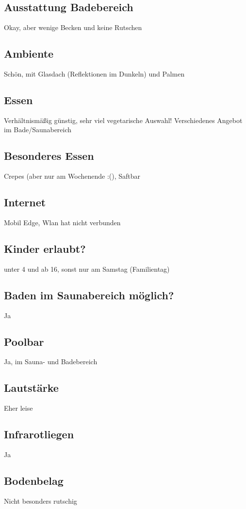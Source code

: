 \documentclass{article}
\begin{document}
\subsection*{Ausstattung Badebereich} Okay, aber wenige Becken und keine Rutschen
\subsection*{Ambiente} Schön, mit Glasdach (Reflektionen im Dunkeln) und Palmen
\subsection*{Essen} Verhältnismäßig günstig, sehr viel vegetarische Auswahl! Verschiedenes Angebot im Bade/Saunabereich
\subsection*{Besonderes Essen} Crepes (aber nur am Wochenende :(), Saftbar
\subsection*{Internet} Mobil Edge, Wlan hat nicht verbunden
\subsection*{Kinder erlaubt?} unter 4 und ab 16, sonst nur am Samstag (Familientag)
\subsection*{Baden im Saunabereich möglich?} Ja
\subsection*{Poolbar} Ja, im Sauna- und Badebereich
\subsection*{Lautstärke} Eher leise
\subsection*{Infrarotliegen} Ja
\subsection*{Bodenbelag} Nicht besonders rutschig
\pagebreak
\end{document}
